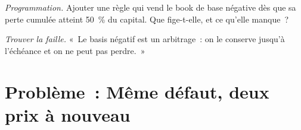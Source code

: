 \begin{exercise}[$\star\star\star$]\label{exo:s2:credit-relative-value:7}
\emph{Programmation.} Ajouter une règle qui vend le book de base négative dès que sa perte cumulée atteint 50~\% du capital. Que fige-t-elle, et
ce qu'elle manque~?
\end{exercise}

\begin{exercise}[$\star\star\star$]\label{exo:s2:credit-relative-value:8}
\emph{Trouver la faille.} «~Le basis négatif est un arbitrage~: on le conserve jusqu'à l'échéance et on ne peut pas perdre.~»
\end{exercise}

\section{Problème~: Même défaut, deux prix à nouveau}

